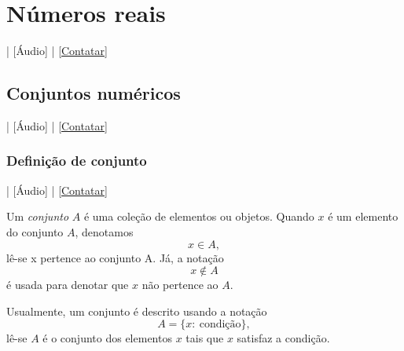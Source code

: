 
\chapter{Números reais}\label{cap_numreal}
\thispagestyle{fancy}

\begin{flushright}
  [Vídeo] | [Áudio] | \href{https://phkonzen.github.io/notas/contato.html}{[Contatar]}
\end{flushright}

\section{Conjuntos numéricos}\label{cap_numreal_sec_funconj}

\begin{flushright}
  [Vídeo] | [Áudio] | \href{https://phkonzen.github.io/notas/contato.html}{[Contatar]}
\end{flushright}

\subsection{Definição de conjunto}

\begin{flushright}
  [Vídeo] | [Áudio] | \href{https://phkonzen.github.io/notas/contato.html}{[Contatar]}
\end{flushright}

Um \emph{conjunto} $A$ é uma coleção de elementos ou objetos. Quando $x$ é um elemento do conjunto $A$, denotamos
\begin{equation}
  x\in A,
\end{equation}
lê-se x pertence ao conjunto A. Já, a notação
\begin{equation}
  x\not\in A
\end{equation}
é usada para denotar que $x$ não pertence ao $A$.

Usualmente, um conjunto é descrito usando a notação
\begin{equation}
  A = \{x:~\text{condição}\},
\end{equation}
lê-se $A$ é o conjunto dos elementos $x$ tais que $x$ satisfaz a condição.

